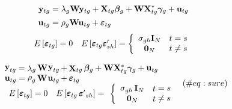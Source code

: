 \documentclass[10pt,a4paper]{article}
\begin{document}
\begin{align}
 {\bf y}_{tg} &= \lambda_{g} {\bf W}{\bf y}_{tg} + {\bf X}_{tg} {\boldsymbol \beta}_{g} + 
 {\bf W} {\bf X}_{tg}^* {\boldsymbol \gamma}_{g} + {\bf u}_{tg}   \\
{\bf u}_{tg} &= \rho_{g} {\bf W} {\bf u}_{tg} + {\boldsymbol \varepsilon}_{tg}  \nonumber  
\end{align}
\begin{equation*}
\begin{array}{cc} 
E \left[ {\boldsymbol \varepsilon}_{tg} \right] = 0 & 
E \left[ {\boldsymbol \varepsilon}_{tg} {\boldsymbol \varepsilon}'_{sh} \right] =
\left\{ \begin{array}{cc} 
\sigma_{gh} {\bf I}_{N} & t = s \\ 
{\bf 0}_{N} & t \ne s 
\end{array} \right.
\end{array}
\end{equation*}

\begin{equation}
\left.\begin{array}{lll}
{\mathop{{\bf y}}\nolimits_{tg} =\mathop{\lambda }\nolimits_{g} {\bf W} \mathop{{\bf y}}\nolimits_{tg} +\mathop{{\bf X}}\nolimits_{tg} {\boldsymbol \beta}_{g}+{\bf W} {\bf X}_{tg}^* {\boldsymbol \gamma}_{g}+\mathop{{\bf u}}\nolimits_{tg} } \\
{\mathop{{\bf u}}\nolimits_{tg} =\mathop{\rho }\nolimits_{g} {\bf W} \mathop{{\bf u}}\nolimits_{tg} +\mathop{{\boldsymbol \varepsilon}}\nolimits_{tg} }\\
\begin{array}{cc} 
{E\left[\mathop{{\boldsymbol \varepsilon}}\nolimits_{tg} \right]=0} & {E\left[\mathop{{\boldsymbol \varepsilon}}\nolimits_{\mathop{tg}} \mathop{{\boldsymbol \varepsilon}'}\nolimits_{\mathop{sh}} \right]=}
\end{array}
\left\{ \begin{array}{cc} {\mathop{\sigma}\nolimits_{gh} {\bf I}_{N}} & {\mathop{t} = \mathop{s}} \\ {{\bf 0}_{N} } & {\mathop{t} \ne \mathop{s} }
\end{array}\right. 
\end{array}\right.
(\#eq:sure)
\end{equation}
\end{document}

